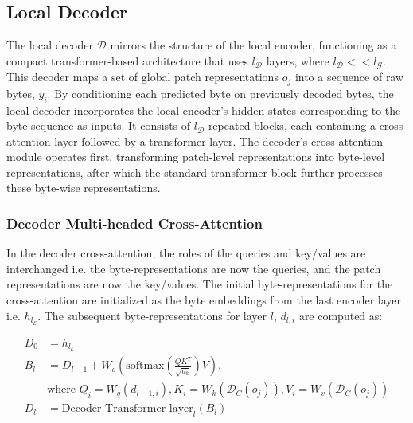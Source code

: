 \subsection{Local Decoder} 

The local decoder $\mathcal{D}$ mirrors the structure of the local encoder, functioning as a compact transformer-based architecture that uses $l_{\mathcal{D}}$ layers, where $l_{\mathcal{D}} << l_{\mathcal{G}}$. This decoder maps a set of global patch representations $o_j$ into a sequence of raw bytes, $y_i$. By conditioning each predicted byte on previously decoded bytes, the local decoder incorporates the local encoder’s hidden states corresponding to the byte sequence as inputs. It consists of $l_{\mathcal{D}}$ repeated blocks, each containing a cross-attention layer followed by a transformer layer. The decoder's cross-attention module operates first, transforming patch-level representations into byte-level representations, after which the standard transformer block further processes these byte-wise representations.

\subsubsection{Decoder Multi-headed Cross-Attention} 

In the decoder cross-attention, the roles of the queries and key/values are interchanged i.e. the byte-representations are now the queries, and the patch representations are now the key/values. The initial byte-representations for the cross-attention are initialized as the byte embeddings from the last encoder layer i.e. $h_{l_{\mathcal{E}}}$. The subsequent byte-representations for layer $l$, $d_{l,i}$ are computed as:

\begin{align}
D_0 &= h_{l_{\mathcal{E}}} \\
B_l &= D_{l-1} + W_o\left(\text{softmax}\left(\frac{QK^T}{\sqrt{d_k}}\right)V\right), \\
  &\text{where } Q_i = W_q(d_{l-1,i}), K_i = W_k(\mathcal{D}_C(o_j)), V_i = W_v(\mathcal{D}_C(o_j)) \\
  D_l &= \text{Decoder-Transformer-layer}_l(B_l)
\end{align}

